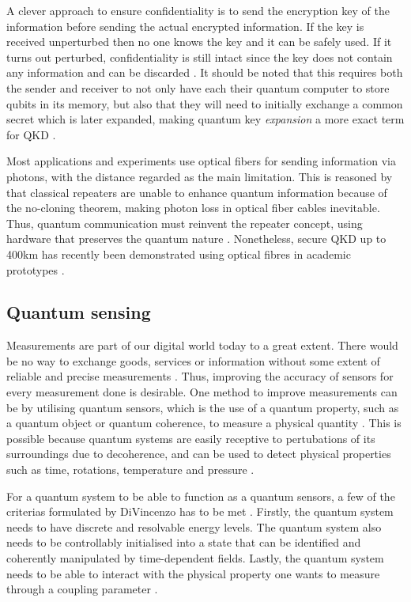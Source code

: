 A clever approach to ensure confidentiality is to send the encryption key of the information before sending the actual encrypted information. If the key is received unperturbed then no one knows the key and it can be safely used. If it turns out perturbed, confidentiality is still intact since the key does not contain any information and can be discarded \cite{Gisin2002}. It should be noted that this requires both the sender and receiver to not only have each their quantum computer to store qubits in its memory, but also that they will need to initially exchange a common secret which is later expanded, making quantum key \textit{expansion} a more exact term for QKD \cite{Pavicic2006, Gisin2007}.

Most applications and experiments use optical fibers for sending information via photons, with the distance regarded as the main limitation. This is reasoned by that classical repeaters are unable to enhance quantum information because of the no-cloning theorem, making photon loss in optical fiber cables inevitable. Thus, quantum communication must reinvent the repeater concept, using hardware that preserves the quantum nature \cite{Acin2018}. Nonetheless, secure QKD up to 400km has recently been demonstrated using optical fibres in academic prototypes \cite{Boaron2018}.

\subsection{Quantum sensing}

Measurements are part of our digital world today to a great extent. There would be no way to exchange goods, services or information without some extent of reliable and precise measurements \cite{Acin2018}. Thus, improving the accuracy of sensors for every measurement done is desirable. One method to improve measurements can be by utilising quantum sensors, which is the use of a quantum property, such as a quantum object or quantum coherence, to measure a physical quantity \cite{Degen2017}. This is possible because quantum systems are easily receptive to pertubations of its surroundings due to decoherence, and can be used to detect physical properties such as time, rotations, temperature and pressure \cite{Degen2017}.

For a quantum system to be able to function as a quantum sensors, a few of the criterias formulated by DiVincenzo has to be met \cite{DiVincenzo2000}. Firstly, the quantum system needs to have discrete and resolvable energy levels. The quantum system also needs to be controllably initialised into a state that can be identified and coherently manipulated by time-dependent fields. Lastly, the quantum system needs to be able to interact with the physical property one wants to measure through a coupling parameter \cite{Degen2017}.


